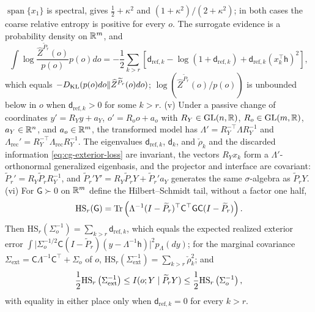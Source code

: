 \(\operatorname{span}\{x_1\}\) is spectral, gives \(\tfrac12+\kappa^2\) and
\((1+\kappa^2)/(2+\kappa^2)\); in both cases the coarse relative entropy is
positive for every \(o\). The surrogate evidence is a probability density on
\(\mathbb R^m\), and
\begin{equation}
\int\log\frac{\widehat Z^{\widetilde P_r}(o)}{p(o)}p(o)do
=-\frac12\sum_{k>r}\left[\mathsf d_{\mathrm{ref},k}-\log\left(1+\mathsf d_{\mathrm{ref},k}\right)
+\mathsf d_{\mathrm{ref},k}\left(x_k^\top\mathsf h\right)^2\right],
\label{eq:cg-exterior-evidence}
\end{equation}
which equals \(-D_{\mathrm{KL}}(p(o)do\Vert\widehat Z^{\widetilde P_r}(o)do)\); \(\log(\widehat Z^{\widetilde P_r}(o)/p(o))\) is unbounded below in
\(o\) when \(\mathsf d_{\mathrm{ref},k}>0\) for some \(k>r\).
(v) Under a passive change of coordinates \(y'=R_Yy+a_Y\), \(o'=R_oo+a_o\) with
\(R_Y\in\mathrm{GL}(n,\mathbb R)\), \(R_o\in\mathrm{GL}(m,\mathbb R)\), \(a_Y\in\mathbb R^n\), and \(a_o\in\mathbb R^m\), the
transformed model has \(\Lambda'=R_Y^{-\top}\Lambda R_Y^{-1}\) and
\(\Lambda_{\mathrm{rec}}'=R_Y^{-\top}\Lambda_{\mathrm{rec}}R_Y^{-1}\). The
eigenvalues \(\mathsf d_{\mathrm{ref},k}\), \(\mathsf d_k\), and \(\check\rho_k\) and
the discarded information \eqref{eq:cg-exterior-loss} are invariant, the vectors
\(R_Yx_k\) form a \(\Lambda'\)-orthonormal generalized eigenbasis, and the
projector and interface are covariant: \(\widetilde P_r'=R_Y\widetilde P_rR_Y^{-1}\),
and \(\widetilde P_r'Y'=R_Y\widetilde P_rY+\widetilde P_r'a_Y\) generates the same
\(\sigma\)-algebra as \(\widetilde P_rY\).
(vi) For \(\mathsf G\succ0\) on \(\mathbb R^m\) define the Hilbert--Schmidt tail, without a
factor one half,
\begin{equation}
\mathrm{HS}_r(\mathsf G)=\operatorname{Tr}\left(\Lambda^{-1}(I-\widetilde P_r)^\top\mathsf C^\top\mathsf G\mathsf C(I-\widetilde P_r)\right).
\label{eq:cg-exterior-tail}
\end{equation}
Then \(\mathrm{HS}_r(\Sigma_o^{-1})=\sum_{k>r}\mathsf d_{\mathrm{ref},k}\), which equals
the expected realized exterior error
\(\int\lvert\Sigma_o^{-1/2}\mathsf C(I-\widetilde P_r)(y-\Lambda^{-1}\mathsf h)\rvert^2p_\Lambda(dy)\);
for the marginal covariance \(\Sigma_{\mathrm{ext}}=\mathsf C\Lambda^{-1}\mathsf C^\top+\Sigma_o\)
of \(o\), \(\mathrm{HS}_r(\Sigma_{\mathrm{ext}}^{-1})=\sum_{k>r}\check\rho_k^2\); and
\begin{equation}
\frac12\mathrm{HS}_r\left(\Sigma_{\mathrm{ext}}^{-1}\right)
\leq I(o;Y\mid\widetilde P_rY)
\leq\frac12\mathrm{HS}_r\left(\Sigma_o^{-1}\right),
\label{eq:cg-exterior-tail-bounds}
\end{equation}
with equality in either place only when \(\mathsf d_{\mathrm{ref},k}=0\) for every
\(k>r\). 

